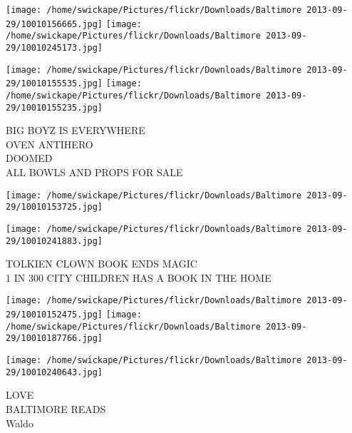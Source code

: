 \documentclass[10pt,letterpaper]{article}
\begin{document}
\texttt{[image: /home/swickape/Pictures/flickr/Downloads/Baltimore 2013-09-29/10010156665.jpg]}
\texttt{[image: /home/swickape/Pictures/flickr/Downloads/Baltimore 2013-09-29/10010245173.jpg]}

\texttt{[image: /home/swickape/Pictures/flickr/Downloads/Baltimore 2013-09-29/10010155535.jpg]}
\texttt{[image: /home/swickape/Pictures/flickr/Downloads/Baltimore 2013-09-29/10010155235.jpg]}

BIG BOYZ IS EVERYWHERE\\
OVEN ANTIHERO\\
DOOMED\\
ALL BOWLS AND PROPS FOR SALE
\pagebreak

\texttt{[image: /home/swickape/Pictures/flickr/Downloads/Baltimore 2013-09-29/10010153725.jpg]}

\vspace{0.25in}
\texttt{[image: /home/swickape/Pictures/flickr/Downloads/Baltimore 2013-09-29/10010241883.jpg]}

TOLKIEN CLOWN BOOK ENDS MAGIC\\
1 IN 300 CITY CHILDREN HAS A BOOK IN THE HOME
\pagebreak

\texttt{[image: /home/swickape/Pictures/flickr/Downloads/Baltimore 2013-09-29/10010152475.jpg]}
\texttt{[image: /home/swickape/Pictures/flickr/Downloads/Baltimore 2013-09-29/10010187766.jpg]}

\texttt{[image: /home/swickape/Pictures/flickr/Downloads/Baltimore 2013-09-29/10010240643.jpg]}

LOVE\\
BALTIMORE READS\\
Waldo
\pagebreak
\end{document}
